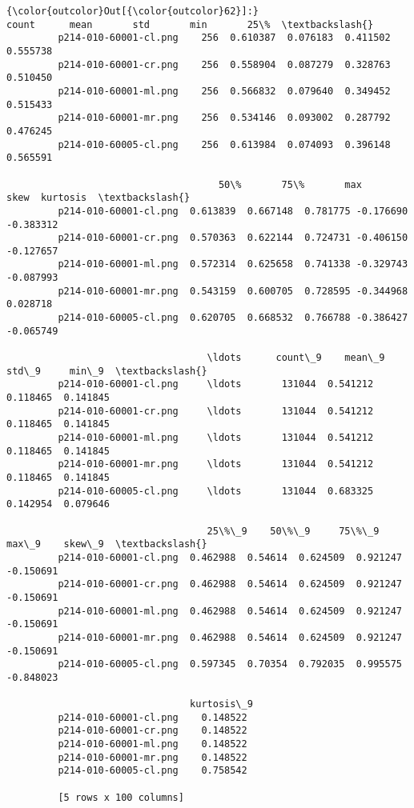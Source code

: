             \begin{Verbatim}[commandchars=\\\{\}]
{\color{outcolor}Out[{\color{outcolor}62}]:}                        count      mean       std       min       25\%  \textbackslash{}
         p214-010-60001-cl.png    256  0.610387  0.076183  0.411502  0.555738
         p214-010-60001-cr.png    256  0.558904  0.087279  0.328763  0.510450
         p214-010-60001-ml.png    256  0.566832  0.079640  0.349452  0.515433
         p214-010-60001-mr.png    256  0.534146  0.093002  0.287792  0.476245
         p214-010-60005-cl.png    256  0.613984  0.074093  0.396148  0.565591

                                     50\%       75\%       max      skew  kurtosis  \textbackslash{}
         p214-010-60001-cl.png  0.613839  0.667148  0.781775 -0.176690 -0.383312
         p214-010-60001-cr.png  0.570363  0.622144  0.724731 -0.406150 -0.127657
         p214-010-60001-ml.png  0.572314  0.625658  0.741338 -0.329743 -0.087993
         p214-010-60001-mr.png  0.543159  0.600705  0.728595 -0.344968  0.028718
         p214-010-60005-cl.png  0.620705  0.668532  0.766788 -0.386427 -0.065749

                                   \ldots      count\_9    mean\_9     std\_9     min\_9  \textbackslash{}
         p214-010-60001-cl.png     \ldots       131044  0.541212  0.118465  0.141845
         p214-010-60001-cr.png     \ldots       131044  0.541212  0.118465  0.141845
         p214-010-60001-ml.png     \ldots       131044  0.541212  0.118465  0.141845
         p214-010-60001-mr.png     \ldots       131044  0.541212  0.118465  0.141845
         p214-010-60005-cl.png     \ldots       131044  0.683325  0.142954  0.079646

                                   25\%\_9    50\%\_9     75\%\_9     max\_9    skew\_9  \textbackslash{}
         p214-010-60001-cl.png  0.462988  0.54614  0.624509  0.921247 -0.150691
         p214-010-60001-cr.png  0.462988  0.54614  0.624509  0.921247 -0.150691
         p214-010-60001-ml.png  0.462988  0.54614  0.624509  0.921247 -0.150691
         p214-010-60001-mr.png  0.462988  0.54614  0.624509  0.921247 -0.150691
         p214-010-60005-cl.png  0.597345  0.70354  0.792035  0.995575 -0.848023

                                kurtosis\_9
         p214-010-60001-cl.png    0.148522
         p214-010-60001-cr.png    0.148522
         p214-010-60001-ml.png    0.148522
         p214-010-60001-mr.png    0.148522
         p214-010-60005-cl.png    0.758542

         [5 rows x 100 columns]
\end{Verbatim}

